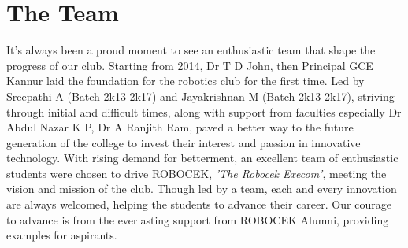 \section{The Team}

It's always been a proud moment to see an enthusiastic team that shape the progress of our club. Starting from 2014, Dr T D John, then Principal GCE Kannur laid the foundation for the robotics club for the first time. Led by Sreepathi A (Batch 2k13-2k17) and Jayakrishnan M (Batch 2k13-2k17), striving through initial and difficult times, along with support from faculties especially Dr Abdul Nazar K P, Dr A Ranjith Ram, paved a better way to the future generation of the college to invest their interest and passion in innovative technology. With rising demand for betterment, an excellent team of enthusiastic students were chosen to drive ROBOCEK, \textit{’The Robocek Execom’}, meeting the vision and mission of the club. Though led by a team, each and every innovation are always welcomed, helping the students to advance their career. Our courage to advance is from the everlasting support from ROBOCEK Alumni, providing examples for aspirants.

\begin{figure}[!h]
	\centering
	\quad
\end{figure}


